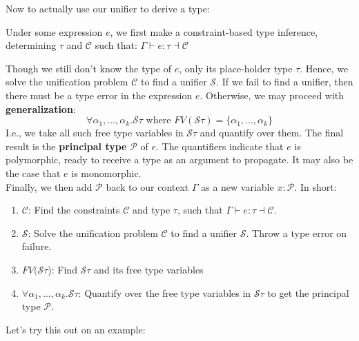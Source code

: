 \noindent
Now to actually use our unifier to derive a type:
\begin{Def} 

    Under some expression $e$, we first make a constraint-based type inference, determining $\tau$ and $\mathcal{C}$ such that:
    $\Gamma \vdash e : \tau \dashv \mathcal{C}$

    
    Though we still don't know the type of $e$, only its place-holder type $\tau$. Hence, we solve the unification problem $\mathcal{C}$ to find a unifier $\mathcal{S}$. If 
    we fail to find a unifier, then there must be a type error in the expression $e$. Otherwise, we may proceed with \textbf{generalization}:
    \[\forall \alpha_1, \ldots, \alpha_k . \mathcal{S}\tau \text{ where } FV(\mathcal{S}\tau) = \{\alpha_1, \ldots, \alpha_k\}\]
    \noindent
    I.e., we take all such free type variables in $\mathcal{S\tau}$ and quantify over them. The final result is the \textbf{principal type} $\mathcal{P}$ of $e$. The 
    quantifiers indicate that $e$ is polymorphic, ready to receive a type as an argument to propagate. It may also be the case that $e$ is monomorphic.\\
    \noindent
    Finally, we then add $\mathcal{P}$ back to our context $\Gamma$ as a new variable $x : \mathcal{P}$. In short: 
    \begin{enumerate}
        \item $\mathcal{C}$: Find the constraints $\mathcal{C}$ and type $\tau$, such that $\Gamma \vdash e : \tau \dashv \mathcal{C}$.
        \item $\mathcal{S}$: Solve the unification problem $\mathcal{C}$ to find a unifier $\mathcal{S}$. Throw a type error on failure.
        \item $FV( \mathcal{S}\tau$): Find $\mathcal{S}\tau$ and its free type variables
        \item $\forall \alpha_1, \ldots, \alpha_k . \mathcal{S}\tau$: Quantify over the free type variables in $\mathcal{S}\tau$ to get the principal type $\mathcal{P}$.
    \end{enumerate}    
\end{Def}

\newpage 
\noindent
Let's try this out on an example:

